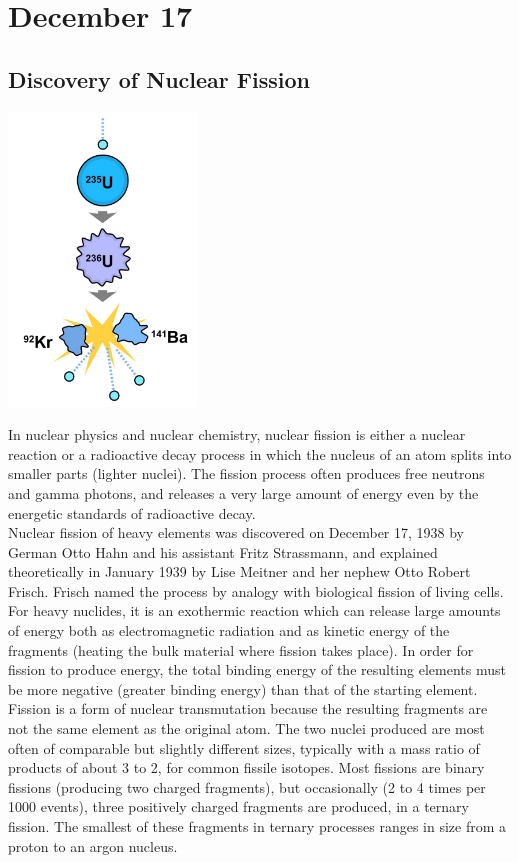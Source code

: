 \documentclass[11pt]{report}
\begin{document}
\section{December 17}
\subsection{Discovery of Nuclear Fission}
\vspace{2mm}\begin{center}\includegraphics[width=5cm]{./img/nuclearFission.jpg}\end{center}
In nuclear physics and nuclear chemistry, nuclear fission is either a nuclear reaction or a radioactive decay process in which the nucleus of an atom splits into smaller parts (lighter nuclei). The fission process often produces free neutrons and gamma photons, and releases a very large amount of energy even by the energetic standards of radioactive decay.\\
\indent Nuclear fission of heavy elements was discovered on December 17, 1938 by German Otto Hahn and his assistant Fritz Strassmann, and explained theoretically in January 1939 by Lise Meitner and her nephew Otto Robert Frisch. Frisch named the process by analogy with biological fission of living cells. For heavy nuclides, it is an exothermic reaction which can release large amounts of energy both as electromagnetic radiation and as kinetic energy of the fragments (heating the bulk material where fission takes place). In order for fission to produce energy, the total binding energy of the resulting elements must be more negative (greater binding energy) than that of the starting element.\\ \indent Fission is a form of nuclear transmutation because the resulting fragments are not the same element as the original atom. The two nuclei produced are most often of comparable but slightly different sizes, typically with a mass ratio of products of about 3 to 2, for common fissile isotopes. Most fissions are binary fissions (producing two charged fragments), but occasionally (2 to 4 times per 1000 events), three positively charged fragments are produced, in a ternary fission. The smallest of these fragments in ternary processes ranges in size from a proton to an argon nucleus.
\end{document}
